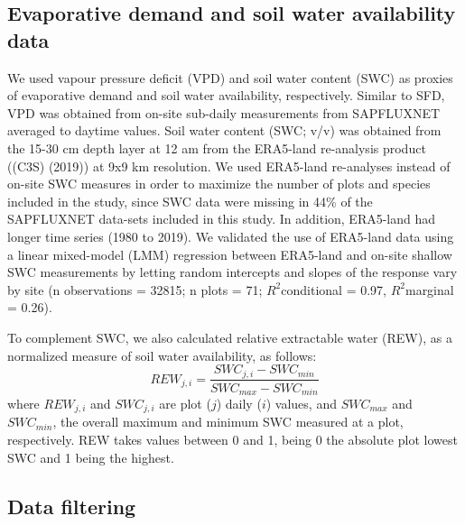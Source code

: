 \documentclass[11pt,twoside]{reedthesis}
\begin{document}
\subsection{Evaporative demand and soil water availability
data}\label{evaporative-demand-and-soil-water-availability-data}

We used vapour pressure deficit (VPD) and soil water content (SWC) as
proxies of evaporative demand and soil water availability, respectively.
Similar to SFD, VPD was obtained from on-site sub-daily measurements
from SAPFLUXNET averaged to daytime values. Soil water content (SWC;
v/v) was obtained from the 15-30 cm depth layer at 12 am from the
ERA5-land re-analysis product ((C3S) (2019)) at 9x9 km resolution. We
used ERA5-land re-analyses instead of on-site SWC measures in order to
maximize the number of plots and species included in the study, since
SWC data were missing in 44\% of the SAPFLUXNET data-sets included in
this study. In addition, ERA5-land had longer time series (1980 to
2019). We validated the use of ERA5-land data using a linear mixed-model
(LMM) regression between ERA5-land and on-site shallow SWC measurements
by letting random intercepts and slopes of the response vary by site (n
observations = 32815; n plots = 71; \(R^2\)conditional = 0.97,
\(R^2\)marginal = 0.26).\par

To complement SWC, we also calculated relative extractable water (REW),
as a normalized measure of soil water availability, as follows:
\begin{equation}
REW_{j,i} = \frac{SWC_{j,i} - SWC_{min}}{SWC_{max} - SWC_{min}}
\end{equation}
where \(REW_{j,i}\) and \(SWC_{j,i}\) are plot (\(j\)) daily (\(i\))
values, and \(SWC_{max}\) and \(SWC_{min}\), the overall maximum and
minimum SWC measured at a plot, respectively. REW takes values between 0
and 1, being 0 the absolute plot lowest SWC and 1 being the highest.\par

\subsection{Data filtering}\label{data-filtering}
\end{document}
